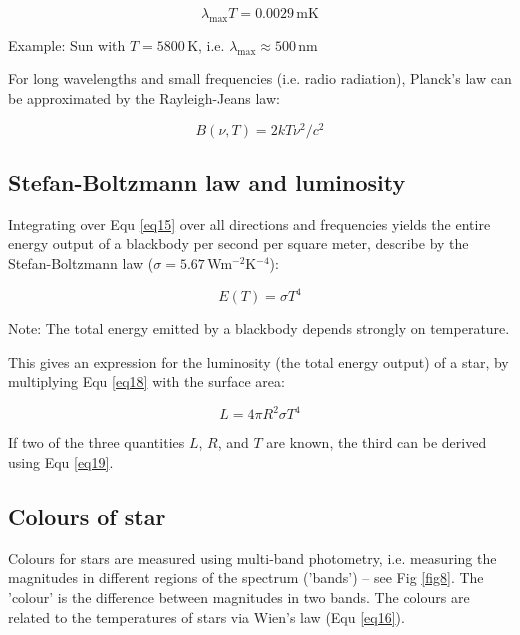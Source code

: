 \begin{equation}
\lambda_{\mathrm{max}} T = 0.0029\,\mathrm{m K}
\label{eq16}
\end{equation}

Example: Sun with $T = 5800$\,K, i.e. $\lambda_{\mathrm{max}} \approx 500$\,nm

For long wavelengths and small frequencies (i.e. radio radiation), Planck's law can be approximated by the Rayleigh-Jeans law:

\begin{equation}
B(\nu,T) = 2kT \nu^2 / c^2
\label{eq17}
\end{equation}

\subsection{Stefan-Boltzmann law and luminosity}

Integrating over Equ \eqref{eq15} over all directions and frequencies yields the entire energy output of a blackbody per second per square meter, describe by the Stefan-Boltzmann law ($\sigma = 5.67$\,Wm$^{-2}$K$^{-4}$):

\begin{equation}
E(T) = \sigma T^4
\label{eq18}
\end{equation}

Note: The total energy emitted by a blackbody depends strongly on temperature.

This gives an expression for the luminosity (the total energy output) of a star, by multiplying Equ \ref{eq18} with the surface area:

\begin{equation}
L = 4 \pi R^2 \sigma T^4
\label{eq19}
\end{equation}

If two of the three quantities $L$, $R$, and $T$ are known, the third can be derived using Equ \eqref{eq19}.

\subsection{Colours of star}

Colours for stars are measured using multi-band photometry, i.e. measuring the magnitudes in different regions of the spectrum ('bands') -- see Fig \ref{fig8}. The 'colour' is the difference between magnitudes in two bands. The colours are related to the temperatures of stars via Wien's law (Equ \eqref{eq16}).

